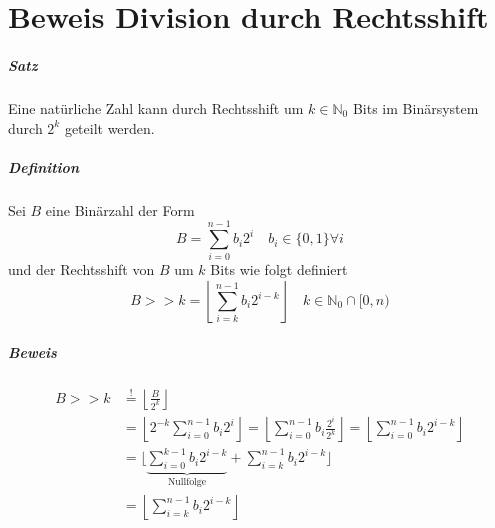 \chapter{Beweis Division durch Rechtsshift}
\label{proof-division}
\writtenby{\dcauthornameewie}%
\paragraph{Satz}
Eine natürliche Zahl kann durch Rechtsshift um $k\in\mathbb{N}_0$ Bits im Binärsystem durch $2^k$ geteilt werden.

\paragraph{Definition}
Sei $B$ eine Binärzahl der Form
  \[ B = \sum_{i=0}^{n-1} b_i 2^i \quad b_i \in \{0,1\} \forall i \]
und der Rechtsshift von $B$ um $k$ Bits wie folgt definiert
  \[ B >\!\!> k = \left\lfloor\sum_{i=k}^{n-1} b_i 2^{i-k}\right\rfloor
       \quad k\in\mathbb{N}_0 \cap [0,n) \]

\paragraph{Beweis}
\begin{align*}
  B >\!\!> k &\overset{!}{=} \left\lfloor\frac{B}{2^k}\right\rfloor \\
    &= \left\lfloor2^{-k} \sum_{i=0}^{n-1} b_i 2^i\right\rfloor
     = \left\lfloor\sum_{i=0}^{n-1} b_i \frac{2^i}{2^{k}}\right\rfloor
     = \left\lfloor\sum_{i=0}^{n-1} b_i 2^{i-k}\right\rfloor \\
    &= \Bigg\lfloor\underbrace{\sum_{i=0}^{k-1} b_i 2^{i-k}}_\text{Nullfolge}
       + \sum_{i=k}^{n-1} b_i 2^{i-k}\Bigg\rfloor \\
    &= \left\lfloor{\sum_{i=k}^{n-1} b_i 2^{i-k}}\right\rfloor \\
\end{align*}
\hfill \qedsymbol

